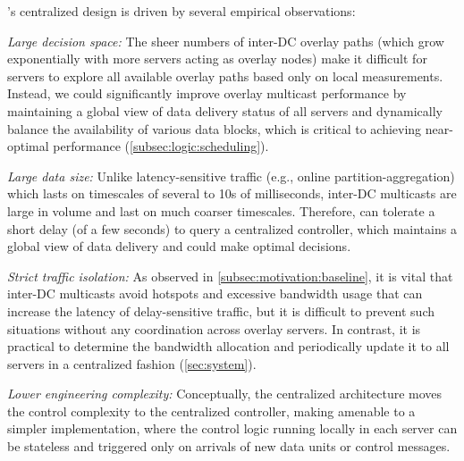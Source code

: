 \name's centralized design is driven by several empirical observations:
\begin{packedenumerate}

\item {\em Large decision space:}
The sheer numbers of inter-DC overlay paths
(which grow exponentially with more servers acting as overlay nodes)
make it difficult for servers to explore all available overlay
paths based only on local measurements.
Instead, we could significantly improve overlay multicast
performance by maintaining a global view of data delivery
status of all servers and dynamically balance
the availability of
various data blocks, which
is critical to achieving near-optimal performance
(\Section\ref{subsec:logic:scheduling}).

\item {\em Large data size:}
Unlike latency-sensitive traffic
(e.g., online partition-aggregation) which lasts on timescales
of several to 10s of milliseconds, inter-DC multicasts are large in volume and
last on much coarser timescales.
Therefore, \name can tolerate a short delay (of a few seconds) to query a
centralized controller, which maintains a global view of data delivery
and could make optimal decisions.

\item {\em Strict traffic isolation:}
As observed in \Section\ref{subsec:motivation:baseline},
it is vital that inter-DC
multicasts avoid hotspots and excessive bandwidth usage that can increase the latency of delay-sensitive traffic,
but it is difficult to prevent such situations
without any coordination across overlay servers.
In contrast, it is practical
to determine the bandwidth allocation and periodically update it
to all servers in a centralized fashion (\Section\ref{sec:system}).

\item {\em Lower engineering complexity:}
Conceptually, the centralized architecture moves the control complexity to
the centralized controller, making \name amenable to a simpler implementation,
where the control logic running locally in each server can be stateless and
triggered only on arrivals of new data units or control messages.

\end{packedenumerate}

